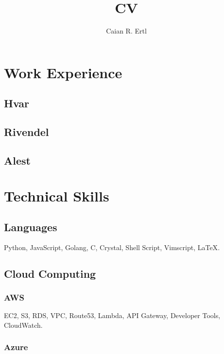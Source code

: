 \documentclass{article}
\renewcommand{\maketitle} {
    \begin{center}
    \bfseries
    \huge
    \theauthor
    \end{center}
}
\begin{document}
\title{CV}
\author{Caian R. Ertl}

\maketitle



\section{Work Experience}

\subsection{Hvar}
\subsection{Rivendel}
\subsection{Alest}



\section{Technical Skills}

\subsection{Languages}

Python, JavaScript, Golang, C, Crystal, Shell Script, Vimscript, {\LaTeX}.


\subsection{Cloud Computing}

\subsubsection{AWS}

EC2, S3, RDS, VPC, Route53, Lambda, API Gateway, Developer Tools, CloudWatch.

\subsubsection{Azure}
\end{document}
